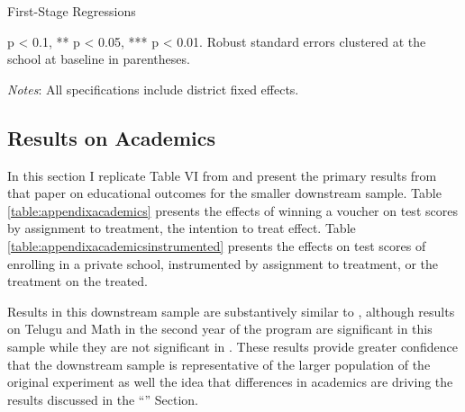 \documentclass[hidelinks, 12pt, titlepage]{article}
\begin{document}
		\clearpage

		\begin{landscape}

			\begin{table}[htb]
				\begin{threeparttable}
					\centering
					\caption{First-Stage Regressions\label{table:appendixfirststage}}
					
					\begin{tablenotes}
						\item * p < 0.1, ** p < 0.05, *** p < 0.01. Robust standard errors clustered at the school at baseline in parentheses.
						\item \emph{Notes}: All specifications include district fixed effects.
					\end{tablenotes}
				\end{threeparttable}
			\end{table}

		\end{landscape}

\clearpage

\subsection{Results on Academics\label{appendix:academics}}

In this section I replicate Table VI from \citep{Muralidharan2015} and present the primary results from that paper on educational outcomes for the smaller downstream sample.  Table \ref{table:appendixacademics} presents the effects of winning a voucher on test scores by assignment to treatment, the intention to treat effect.  Table \ref{table:appendixacademicsinstrumented} presents the effects on test scores of enrolling in a private school, instrumented by assignment to treatment, or the treatment on the treated.

Results in this downstream sample are substantively similar to \cite{Muralidharan2015}, although results on Telugu and Math in the second year of the program are significant in this sample while they are not significant in \cite{Muralidharan2015}.  These results provide greater confidence that the downstream sample is representative of the larger population of the original experiment as well the idea that differences in academics are driving the results discussed in the ``'' Section.
\end{document}
